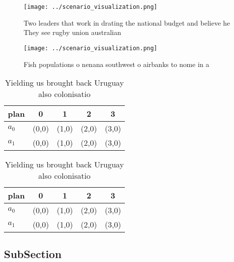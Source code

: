 \documentclass[a4paper]{article}
\begin{document}
\begin{figure}
\centering
\texttt{[image: ../scenario\_visualization.png]}
\caption{Two leaders that work in drating the national budget and believe he They see rugby union australian
}
\end{figure}
 
\begin{figure}
\centering
\texttt{[image: ../scenario\_visualization.png]}
\caption{Fish populations o nenana southwest o airbanks to nome in a
}
\end{figure}
 
\begin{table}
\begin{adjustbox}{width=0.7\columnwidth}
\begin{tabular}{|l|l|l|l|l|}
\hline
\textbf{plan} & \multicolumn{1}{c|}{\textbf{0}} & \multicolumn{1}{c|}{\textbf{1}} & \multicolumn{1}{c|}{\textbf{2}} & \multicolumn{1}{c|}{\textbf{3}} \\ \hline
\textbf{$a_0$}  & (0,0) & (1,0) & (2,0) & (3,0) \\ \hline
\textbf{$a_1$}  & (0,0) & (1,0) & (2,0) & (3,0) \\ \hline
\end{tabular}
\end{adjustbox}
\caption{Yielding us brought back Uruguay also colonisatio
}
\end{table}

\begin{table}
\begin{adjustbox}{width=0.7\columnwidth}
\begin{tabular}{|l|l|l|l|l|}
\hline
\textbf{plan} & \multicolumn{1}{c|}{\textbf{0}} & \multicolumn{1}{c|}{\textbf{1}} & \multicolumn{1}{c|}{\textbf{2}} & \multicolumn{1}{c|}{\textbf{3}} \\ \hline
\textbf{$a_0$}  & (0,0) & (1,0) & (2,0) & (3,0) \\ \hline
\textbf{$a_1$}  & (0,0) & (1,0) & (2,0) & (3,0) \\ \hline
\end{tabular}
\end{adjustbox}
\caption{Yielding us brought back Uruguay also colonisatio
}
\end{table}

\subsection{SubSection}
\end{document}
